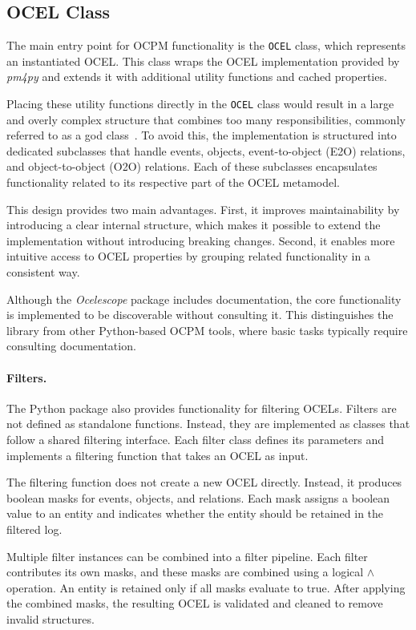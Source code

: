 \subsection{OCEL Class}

The main entry point for OCPM functionality is the \texttt{OCEL} class, which represents an instantiated OCEL. This class wraps the OCEL implementation provided by \textit{pm4py} and extends it with additional utility functions and cached properties.

Placing these utility functions directly in the \texttt{OCEL} class would result in a large and overly complex structure that combines too many responsibilities, commonly referred to as a god class~\cite{god-class}. To avoid this, the implementation is structured into dedicated subclasses that handle events, objects, event-to-object (E2O) relations, and object-to-object (O2O) relations. Each of these subclasses encapsulates functionality related to its respective part of the OCEL metamodel.

This design provides two main advantages. First, it improves maintainability by introducing a clear internal structure, which makes it possible to extend the implementation without introducing breaking changes. Second, it enables more intuitive access to OCEL properties by grouping related functionality in a consistent way.

Although the \textit{Ocelescope} package includes documentation, the core functionality is implemented to be discoverable without consulting it. This distinguishes the library from other Python-based OCPM tools, where basic tasks typically require consulting documentation.

\paragraph{Filters.}
The Python package also provides functionality for filtering OCELs. Filters are not defined as standalone functions. Instead, they are implemented as classes that follow a shared filtering interface. Each filter class defines its parameters and implements a filtering function that takes an OCEL as input.

The filtering function does not create a new OCEL directly. Instead, it produces boolean masks for events, objects, and relations. Each mask assigns a boolean value to an entity and indicates whether the entity should be retained in the filtered log.

Multiple filter instances can be combined into a filter pipeline. Each filter contributes its own masks, and these masks are combined using a logical $\land$ operation. An entity is retained only if all masks evaluate to true. After applying the combined masks, the resulting OCEL is validated and cleaned to remove invalid structures.


